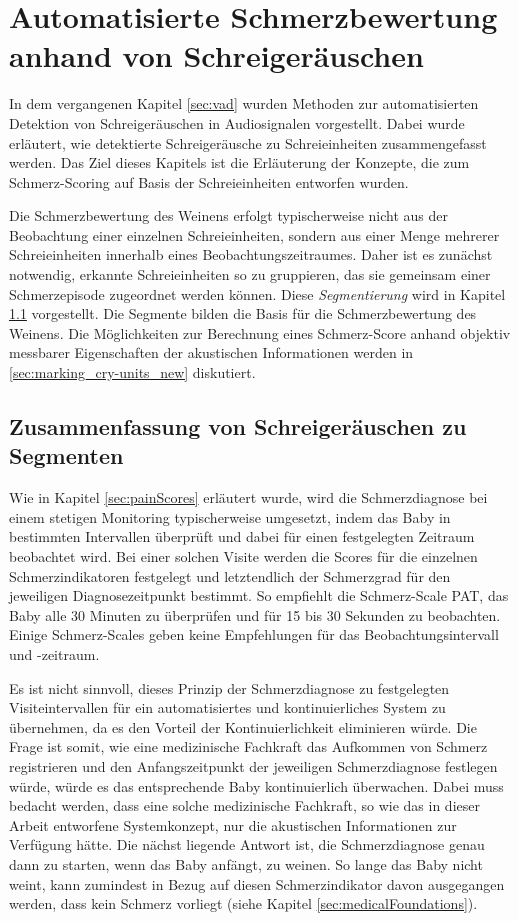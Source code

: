 \chapter{Automatisierte Schmerzbewertung anhand von Schreigeräuschen}
\label{sec:deduction}

In dem vergangenen Kapitel \ref{sec:vad} wurden Methoden zur automatisierten Detektion von Schreigeräuschen in Audiosignalen vorgestellt. Dabei wurde erläutert, wie detektierte Schreigeräusche zu Schreieinheiten zusammengefasst werden. Das Ziel dieses Kapitels ist die Erläuterung der Konzepte, die zum Schmerz-Scoring auf Basis der Schreieinheiten entworfen wurden.

Die Schmerzbewertung des Weinens erfolgt typischerweise nicht aus der Beobachtung einer einzelnen Schreieinheiten, sondern aus einer Menge mehrerer Schreieinheiten innerhalb eines Beobachtungszeitraumes. Daher ist es zunächst notwendig, erkannte Schreieinheiten so zu gruppieren, das sie gemeinsam einer Schmerzepisode zugeordnet werden können. Diese \emph{Segmentierung} wird in Kapitel \ref{sec:segmenting} vorgestellt. Die Segmente bilden die Basis für die Schmerzbewertung des Weinens. Die Möglichkeiten zur Berechnung eines Schmerz-Score anhand objektiv messbarer Eigenschaften der akustischen Informationen werden in \ref{sec:marking_cry-units_new} diskutiert.

\section{Zusammenfassung von Schreigeräuschen zu Segmenten}
\label{sec:segmenting}

Wie in Kapitel \ref{sec:painScores} erläutert wurde, wird die Schmerzdiagnose bei einem stetigen Monitoring typischerweise umgesetzt, indem das Baby in bestimmten Intervallen überprüft und dabei für einen festgelegten Zeitraum beobachtet wird. Bei einer solchen Visite werden die Scores für die einzelnen Schmerzindikatoren festgelegt und letztendlich der Schmerzgrad für den jeweiligen Diagnosezeitpunkt bestimmt. So empfiehlt die Schmerz-Scale PAT, das Baby alle 30 Minuten zu überprüfen und für 15 bis 30 Sekunden zu beobachten. Einige Schmerz-Scales geben keine Empfehlungen für das Beobachtungsintervall und -zeitraum. 

Es ist nicht sinnvoll, dieses Prinzip der Schmerzdiagnose zu festgelegten Visiteintervallen für ein automatisiertes und kontinuierliches System zu übernehmen, da es den Vorteil der Kontinuierlichkeit eliminieren würde. Die Frage ist somit, wie eine medizinische Fachkraft das Aufkommen von Schmerz registrieren und den Anfangszeitpunkt der jeweiligen Schmerzdiagnose festlegen würde, würde es das entsprechende Baby kontinuierlich überwachen. Dabei muss bedacht werden, dass eine solche medizinische Fachkraft, so wie das in dieser Arbeit entworfene Systemkonzept, nur die akustischen Informationen zur Verfügung hätte. Die nächst liegende Antwort ist, die Schmerzdiagnose genau dann zu starten, wenn das Baby anfängt, zu weinen. So lange das Baby nicht weint, kann zumindest in Bezug auf diesen Schmerzindikator davon ausgegangen werden, dass kein Schmerz vorliegt (siehe Kapitel \ref{sec:medicalFoundations}).

